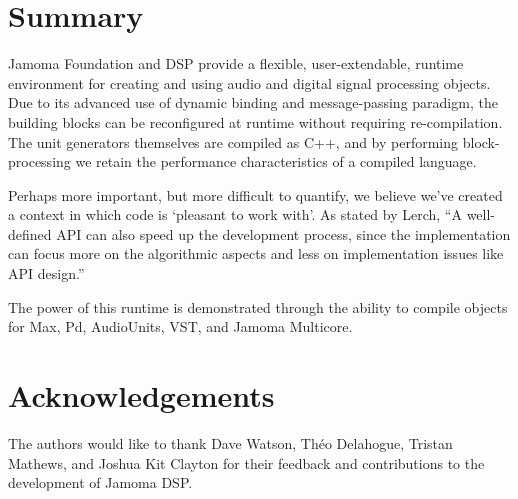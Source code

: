 \documentclass[twoside,10pt]{article}
\begin{document}



\section{Summary} %

Jamoma Foundation and DSP provide a flexible, user-extendable, runtime environment for creating and using audio and digital signal processing objects.  Due to its advanced use of dynamic binding and message-passing paradigm, the building blocks can be reconfigured at runtime without requiring re-compilation.  The unit generators themselves are compiled as C++, and by performing block-processing we retain the performance characteristics of a compiled language.

Perhaps more important, but more difficult to quantify, we believe we've created a context in which code is `pleasant to work with'.  As stated by Lerch, ``A well-defined API can also speed up the development process, since the implementation can focus more on the algorithmic aspects and less on implementation issues like API design.'' \cite{Lerch:2005}

The power of this runtime is demonstrated through the ability to compile objects for Max, Pd, AudioUnits, VST, and Jamoma Multicore.




\section{Acknowledgements} %

The authors would like to thank Dave Watson, Th\'eo Delahogue, Tristan Mathews, and Joshua Kit Clayton for their feedback and contributions to the development of Jamoma DSP.





\end{document}
